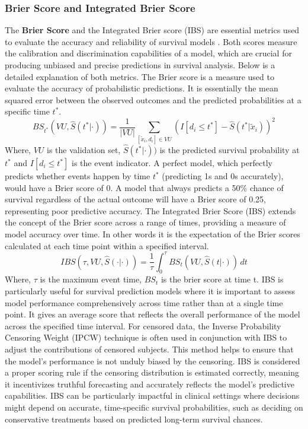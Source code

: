 \subsubsection{Brier Score and Integrated Brier Score}
The \textbf{Brier Score} and the Integrated Brier score (IBS) are essential metrics used to evaluate the accuracy and reliability of survival models \parencite{haider_effective_2018}. Both scores measure the calibration and discrimination capabilities of a model, which are crucial for producing unbiased and precise predictions in survival analysis. Below is a detailed explanation of both metrics. The Brier score is a measure used to evaluate the accuracy of probabilistic predictions. It is essentially the mean squared error \parencite{qi_effective_2023} between the observed outcomes and the predicted probabilities at a specific time \(t^{*}\).
\begin{equation} \label{eq:bs}BS_{t^*}(VU, \hat{S}(t^* | \cdot)) = \frac{1}{|VU|} \sum_{[\tilde{x}_i, d_i] \in VU} (I[d_i \leq t^*] - \hat{S}(t^* | \tilde{x}_i))^2\end{equation}
\noindent Where, \(VU\) is the validation set, \(\hat{S}(t^* | \cdot))\) is the predicted survival probability at \(t^{*}\) and \(I[d_i \leq t^*]\) is the event indicator. A perfect model, which perfectly predicts whether events happen by time \(t^{*}\) (predicting 1s and 0s accurately), would have a Brier score of 0. A model that always predicts a 50\% chance of survival regardless of the actual outcome will have a Brier score of 0.25, representing poor predictive accuracy. The Integrated Brier Score (IBS) extends the concept of the Brier score across a range of times, providing a measure of model accuracy over time. In other words it is the expectation of the Brier scores calculated at each time point within a specified interval.
\begin{equation} \label{eq:ibs}IBS(\tau, VU, \hat{S}(\cdot | \cdot)) = \frac{1}{\tau} \int_0^{\tau} BS_t(VU, \hat{S}(t | \cdot)) \, dt\end{equation}
\noindent Where, \(\tau\) is the maximum event time, \(BS_{t}\) is the brier score at time t.
\noindent IBS is particularly useful for survival prediction models where it is important to assess model performance comprehensively across time rather than at a single time point. It gives an average score that reflects the overall performance of the model across the specified time interval. For censored data, the Inverse Probability Censoring Weight (IPCW) \parencite{haider_effective_2018} technique is often used in conjunction with IBS to adjust the contributions of censored subjects. This method helps to ensure that the model's performance is not unduly biased by the censoring. IBS is considered a proper scoring rule if the censoring distribution is estimated correctly, meaning it incentivizes truthful forecasting and accurately reflects the model's predictive capabilities. IBS can be particularly impactful in clinical settings where decisions might depend on accurate, time-specific survival probabilities, such as deciding on conservative treatments based on predicted long-term survival chances.

